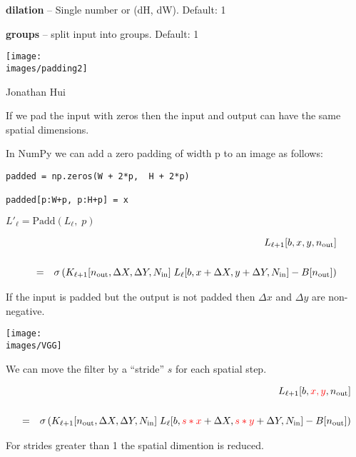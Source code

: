{\medskip
{\bf dilation} – Single number or (dH, dW). Default: 1

\medskip
{\bf groups} – split input into groups. Default: 1


\centerline{\texttt{[image: \\images/padding2]}}
\centerline{\large Jonathan Hui}

\vfill
If we pad the input with zeros then the input and output can have the same spatial dimensions.


In NumPy we can add a zero padding of width p to an image as follows:

\vfill
\begin{verbatim}
padded = np.zeros(W + 2*p,  H + 2*p)

padded[p:W+p, p:H+p] = x
\end{verbatim}


$L'_{{\ell}} = \mathrm{Padd}(L_{{\ell}},\;p)$

\vfill
\begin{eqnarray*}
 & &  L_{{\ell+1}}[b,x,y,n_{\mathrm{out}}] \\
 \\
  & = &   \sigma\left(K_{\ell+1}[n_{\mathrm{out}},\Delta X, \Delta Y,N_{\mathrm{in}}]\; L_{{\ell}}[b,x + \Delta X, y + \Delta Y, N_{\mathrm{in}}] - B[n_{\mathrm{out}}]\right)
\end{eqnarray*}

\vfill
If the input is padded but the output is not padded then $\Delta x$ and $\Delta y$ are non-negative.


\centerline{\texttt{[image: \\images/VGG]}}


We can move the filter by a ``stride'' $s$ for each spatial step.


\vfill
{\huge
\begin{eqnarray*}
 & &  L_{{\ell+1}}[b,{\color{red}x,y},n_{\mathrm{out}}] \\
 \\
  & = &   \sigma\left(K_{\ell+1}[n_{\mathrm{out}},\Delta X, \Delta Y,N_{\mathrm{in}}]\; L_{{\ell}}[b,{\color{red} s*x} + \Delta X, {\color{red} s*y} + \Delta Y, N_{\mathrm{in}}] - B[n_{\mathrm{out}}]\right)
\end{eqnarray*}
}

\vfill
For strides greater than 1 the spatial dimention is reduced.

}

